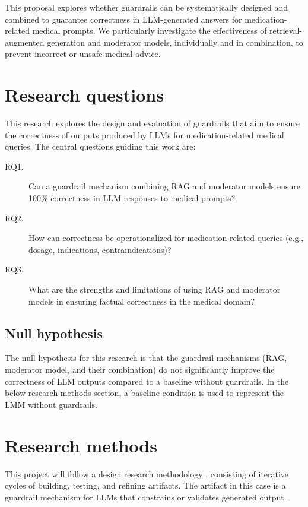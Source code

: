 \documentclass[a4paper,doc,natbib]{apa6}
\begin{document}
    This proposal explores whether guardrails can be systematically designed and combined to guarantee correctness in LLM-generated answers for medication-related medical prompts.
    We particularly investigate the effectiveness of retrieval-augmented generation and moderator models, individually and in combination, to prevent incorrect or unsafe medical advice.

    \section{Research questions}

    This research explores the design and evaluation of guardrails that aim to ensure the correctness of outputs produced by LLMs for medication-related medical queries.
    The central questions guiding this work are:

    \begin{description}
        \item[RQ1.] Can a guardrail mechanism combining RAG and moderator models ensure 100\% correctness in LLM responses to medical prompts?
        \item[RQ2.] How can correctness be operationalized for medication-related queries (e.g., dosage, indications, contraindications)?
        \item[RQ3.] What are the strengths and limitations of using RAG and moderator models in ensuring factual correctness in the medical domain?
    \end{description}

    \subsection{Null hypothesis}
    The null hypothesis for this research is that the guardrail mechanisms (RAG, moderator model, and their combination)
    do not significantly improve the correctness of LLM outputs compared to a baseline without guardrails.
    In the below research methods section, a baseline condition is used to represent the LMM without guardrails.

    \section{Research methods}

    This project will follow a design research methodology \cite{wieringa2014design}, consisting of iterative cycles of building, testing, and refining artifacts.
    The artifact in this case is a guardrail mechanism for LLMs that constrains or validates generated output.
\end{document}
